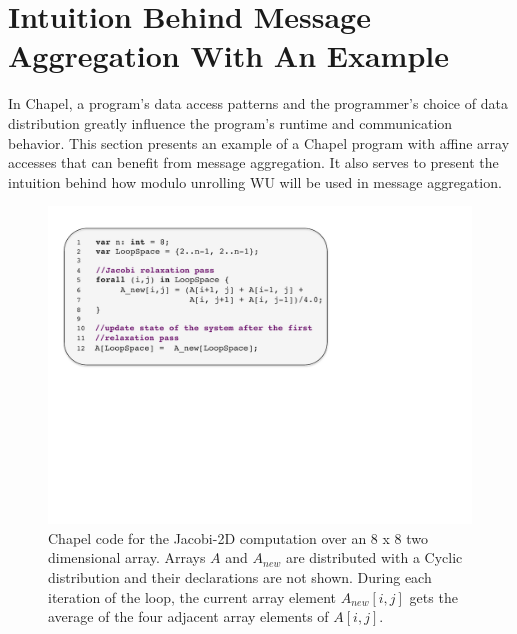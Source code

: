 \section{Intuition Behind Message Aggregation With An Example}\label{sec:motivation_for_aggregation} 

In Chapel, a program's data access patterns and the programmer's choice of data distribution greatly influence the program's runtime and communication behavior. This section presents an example of a Chapel program with affine array accesses that can benefit from message aggregation. It also serves to present the intuition behind how modulo unrolling WU will be used in message aggregation. 

\begin{figure}
\begin{center}
\includegraphics[scale=0.51]{./Figures/jacobi}
\caption{Chapel code for the Jacobi-2D computation over an 8 x 8 two dimensional array. Arrays $A$ and $A_{new}$ are distributed with a Cyclic distribution and their declarations are not shown. During each iteration of the loop, the current array element $A_{new}[i, j]$ gets the average of the four adjacent array elements of $A[i, j]$.}
\label{jacobi_code}
\end{center}
\end{figure}

